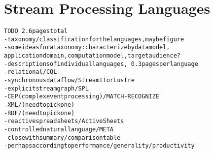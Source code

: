 \section{Stream Processing Languages}\label{sec:languages}

\begin{alltt}TODO\scriptsize ~2.6 pages total
- taxonomy/classification for the languages, maybe figure
  - some ideas for a taxonomy: characterize by data model,
    application domain, computation model, target audience?
- descriptions of individual languages, ~0.3 pages per language
  - relational / CQL \cite{arasu_babu_widom_2006}
  - synchronous dataflow / StreamIt \cite{thies_et_al_2002} or Lustre
  - explicit stream graph / SPL \cite{hirzel_et_al_2013}
  - CEP (complex event processing) / MATCH-RECOGNIZE \cite{zemke_et_al_2007}
  - XML / (need to pick one)
  - RDF / (need to pick one)
  - reactive spreadsheets / ActiveSheets \cite{vaziri_et_al_2014}
  - controlled natural language / META \cite{arnold_et_al_2016}
- close with summary/comparison table
  - perhaps according to performance/generality/productivity
\end{alltt}
